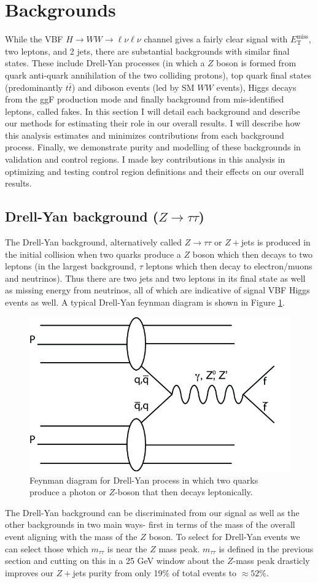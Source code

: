 \section{Backgrounds}
While the VBF $H\rightarrow WW\rightarrow \ell\nu\ell\nu$ channel gives a fairly clear signal with $E_{\text{T}}^{\text{miss}}$, two leptons, and 2 jets, there are substantial backgrounds with similar final states. These include Drell-Yan processes (in which a $Z$ boson is formed from quark  anti-quark annihilation of the two colliding protons), top quark final states (predominantly $t\bar{t}$) and diboson events (led by SM $WW$ events), Higgs decays from the ggF production mode and finally background from mis-identified leptons, called fakes. In this section I will detail each background and describe our methods for estimating their role in our overall results. I will describe how this analysis estimates and minimizes contributions from each background process. Finally, we demonstrate purity and modelling of these backgrounds in validation and control regions. I made key contributions in this analysis in optimizing and testing control region definitions and their effects on our overall results. 
\subsection{Drell-Yan background ($Z\rightarrow \tau\tau$)}
The Drell-Yan background, alternatively called $Z\rightarrow \tau\tau$ or $Z+$jets is produced in the initial collision when two quarks produce a $Z$ boson which then decays to two leptons (in the largest background, $\tau$ leptons which then decay to electron/muons and neutrinos).  Thus there are two jets and two leptons in its final state as well as missing energy from neutrinos, all of which are indicative of signal VBF Higgs events as well. A typical Drell-Yan feynman diagram is shown in Figure \ref{fig:DrellYan}. 
\begin{figure}
\centering
  \includegraphics[width=.5\linewidth]{Pictures/FeynmanDrellYan.png}
\caption{Feynman diagram for Drell-Yan process in which two quarks produce a photon or $Z$-boson that then decays leptonically.}
\label{fig:DrellYan}
\end{figure}
The Drell-Yan background can be discriminated from our signal as well as the other backgrounds in two main ways- first in terms of the mass of the overall event aligning with the mass of the $Z$ boson. To select for Drell-Yan events we can select those which $m_{\tau\tau}$ is near the $Z$ mass peak. $m_{\tau\tau}$ is defined in the previous section and cutting on this in a 25 GeV window about the $Z$-mass peak drasticly improves our $Z+$jets purity from only 19$\%$ of total events to $\approx52\%$. 

